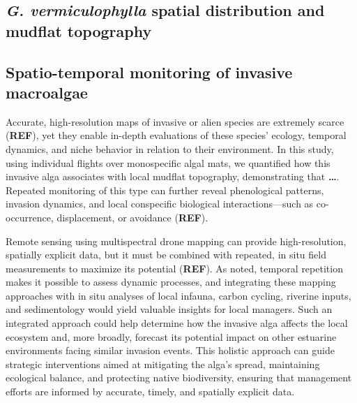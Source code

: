 \documentclass[
  letterpaper,
  DIV=11,
  numbers=noendperiod]{scrartcl}
\begin{document}
\subsection{\texorpdfstring{\emph{G. vermiculophylla} spatial
distribution and mudflat
topography}{G. vermiculophylla spatial distribution and mudflat topography}}\label{g.-vermiculophylla-spatial-distribution-and-mudflat-topography}

\subsection{Spatio-temporal monitoring of invasive
macroalgae}\label{spatio-temporal-monitoring-of-invasive-macroalgae}

Accurate, high-resolution maps of invasive or alien species are
extremely scarce (\textbf{REF}), yet they enable in-depth evaluations of
these species' ecology, temporal dynamics, and niche behavior in
relation to their environment. In this study, using individual flights
over monospecific algal mats, we quantified how this invasive alga
associates with local mudflat topography, demonstrating that
\textbf{\ldots{}}. Repeated monitoring of this type can further reveal
phenological patterns, invasion dynamics, and local conspecific
biological interactions---such as co-occurrence, displacement, or
avoidance (\textbf{REF}).

Remote sensing using multispectral drone mapping can provide
high-resolution, spatially explicit data, but it must be combined with
repeated, in situ field measurements to maximize its potential
(\textbf{REF}). As noted, temporal repetition makes it possible to
assess dynamic processes, and integrating these mapping approaches with
in situ analyses of local infauna, carbon cycling, riverine inputs, and
sedimentology would yield valuable insights for local managers. Such an
integrated approach could help determine how the invasive alga affects
the local ecosystem and, more broadly, forecast its potential impact on
other estuarine environments facing similar invasion events. This
holistic approach can guide strategic interventions aimed at mitigating
the alga's spread, maintaining ecological balance, and protecting native
biodiversity, ensuring that management efforts are informed by accurate,
timely, and spatially explicit data.
\end{document}
